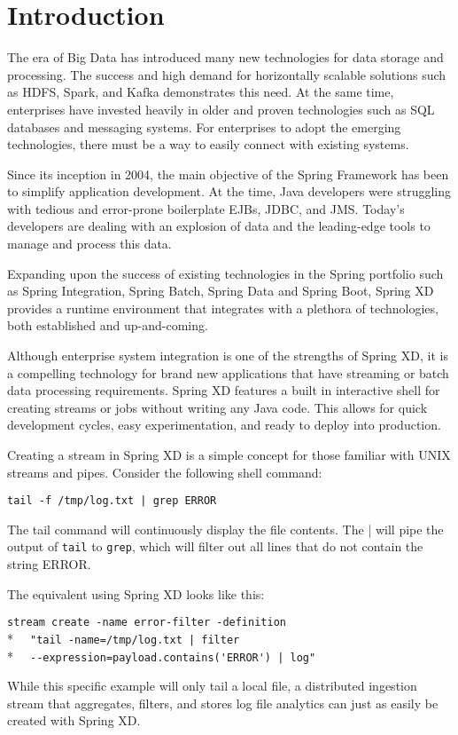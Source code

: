 \section{Introduction}

The era of Big Data has introduced many new technologies for data storage
and processing. The success and high demand for horizontally scalable
solutions such as HDFS, Spark, and Kafka demonstrates this need. At the
same time, enterprises have invested heavily in older and proven
technologies such as SQL databases and messaging systems. For enterprises
to adopt the emerging technologies, there must be a way to easily
connect with existing systems.

Since its inception in 2004, the main objective of the Spring\cite{spring} Framework
has been to simplify application development. At the time, Java developers
were struggling with tedious and error-prone boilerplate EJBs\cite{ejb}, JDBC\cite{jdbc},
and JMS\cite{jms}. Today's developers are dealing with an explosion of data and the
leading-edge tools to manage and process this data.

Expanding upon the success of existing technologies in the Spring portfolio
such as Spring Integration, Spring Batch, Spring Data and Spring Boot,
Spring XD provides a runtime environment that integrates with
a plethora of technologies, both established and up-and-coming.

Although enterprise system integration is one of the strengths of Spring XD,
it is a compelling technology for brand new applications that have streaming
or batch data processing requirements. Spring XD features a built in
interactive shell for creating streams or jobs without writing any Java code.
This allows for quick development cycles, easy experimentation, and ready
to deploy into production.

Creating a stream in Spring XD is a simple concept for those familiar with
UNIX streams and pipes. Consider the following shell command:

\verb;tail -f /tmp/log.txt | grep ERROR;

The tail command will continuously display the file contents. The |
will pipe the output of \texttt{tail} to \texttt{grep}, which will filter 
out all lines that do not contain the string ERROR.

The equivalent using Spring XD looks like this:

\verb;stream create -name error-filter -definition;\\*
\verb;  "tail -name=/tmp/log.txt | filter;\\*
\verb;  --expression=payload.contains('ERROR') | log";

While this specific example will only tail a local file, a distributed 
ingestion stream that aggregates, filters, and stores log file analytics
can just as easily be created with Spring XD.
